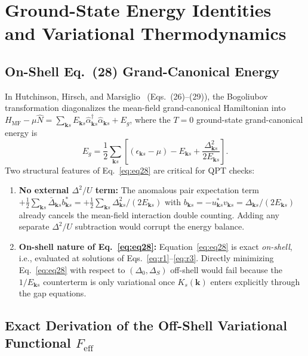 \documentclass[aps,prb,twocolumn,superscriptaddress,longbibliography,floatfix]{revtex4-2}
\newcommand{\ks}{\mathbf{k}s}
\begin{document}
\section{Ground-State Energy Identities and Variational Thermodynamics}
\label{sec:energy_math}

\subsection{On-Shell Eq.~(28) Grand-Canonical Energy}

In Hutchinson, Hirsch, and Marsiglio~\cite{Hutchinson2018} (Eqs.~(26)--(29)), the Bogoliubov transformation diagonalizes the mean-field grand-canonical Hamiltonian into $H_{\mathrm{MF}}-\mu\hat{N} = \sum_{\ks} E_{\ks}\hat{\alpha}_{\ks}^\dagger\hat{\alpha}_{\ks} + E_g$, where the $T=0$ ground-state grand-canonical energy is
\begin{equation}
\boxed{
E_g = \frac{1}{2}\sum_{\ks}\left[(\epsilon_{\ks}-\mu) - E_{\ks} + \frac{\Delta_{\ks}^2}{2E_{\ks}}\right].
}
\label{eq:eq28}
\end{equation}
Two structural features of Eq.~\eqref{eq:eq28} are critical for QPT checks:
\begin{enumerate}
\item \textbf{No external $\Delta^2/U$ term:} The anomalous pair expectation term $+\frac{1}{2}\sum_{\ks}\bar{\Delta}_{\ks}b_{\ks}^* = +\frac{1}{2}\sum_{\ks}\Delta_{\ks}^2/(2E_{\ks})$ with $b_{\ks}=-u_{\ks}^*v_{\ks}=\Delta_{\ks}/(2E_{\ks})$ already cancels the mean-field interaction double counting. Adding any separate $\Delta^2/U$ subtraction would corrupt the energy balance.
\item \textbf{On-shell nature of Eq.~\eqref{eq:eq28}:} Equation~\eqref{eq:eq28} is exact \emph{on-shell}, i.e., evaluated at solutions of Eqs.~\eqref{eq:r1}--\eqref{eq:r3}. Directly minimizing Eq.~\eqref{eq:eq28} with respect to $(\Delta_0,\Delta_S)$ off-shell would fail because the $1/E_{\ks}$ counterterm is only variational once $K_s(\mathbf{k})$ enters explicitly through the gap equations.
\end{enumerate}

\subsection{Exact Derivation of the Off-Shell Variational Functional \texorpdfstring{$F_{\mathrm{eff}}$}{Feff}}
\end{document}
